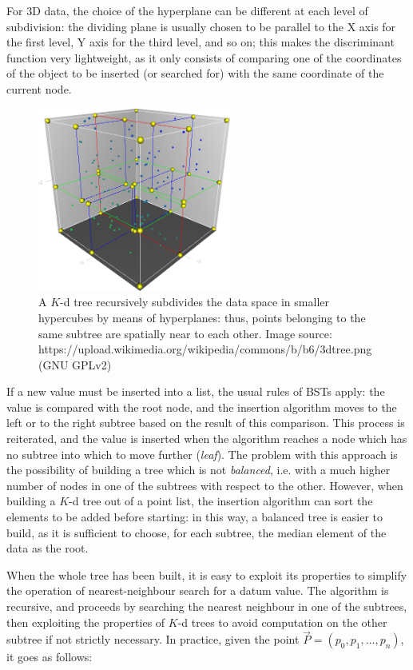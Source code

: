 For 3D data, the choice of the hyperplane can be different at each level of
subdivision: the dividing plane is usually chosen to be parallel to the X axis
for the first level, Y axis for the third level, and so on; this makes the
discriminant function very lightweight, as it only consists of comparing one of
the coordinates of the object to be inserted (or searched for) with the same
coordinate of the current node.

\begin{figure}[htbp]
\centering
  \includegraphics[width=2.5in]{./Graphics/kdtree} 
  \caption{A $K$-d tree recursively subdivides the data space in smaller
  hypercubes by means of hyperplanes: thus, points belonging to the same subtree
  are spatially near to each
  other. Image source:
https://upload.wikimedia.org/wikipedia/commons/b/b6/3dtree.png (GNU GPLv2)  \label{fig:kd-tree-subdiv}}
\end{figure}

If a new value must be inserted into a list, the usual rules of BSTs apply:
the value is compared with the root node, and the insertion algorithm moves to
the left or to the right subtree based on the result of this comparison. This
process is reiterated, and the
value is inserted when the algorithm reaches a node which has no subtree into
which to move further (\emph{leaf}). The problem with this approach is the
possibility of building a tree which is not \emph{balanced}, i.e. with a much
higher number of nodes in one of the subtrees with respect to the other. However,
when building a $K$-d tree out of a point list, the insertion algorithm can sort
the elements to be added before starting: in this way, a balanced tree is easier
to build, as it is sufficient to choose, for each subtree, the median element of
the data as the root.

When the whole tree has been built, it is easy to exploit its properties to
simplify the operation of nearest-neighbour search for a datum value. The
algorithm is recursive, and proceeds by searching the nearest neighbour in one
of the subtrees, then exploiting the properties of $K$-d trees to avoid
computation on the other subtree if not strictly necessary. In practice, given
the point $\vec{P}=\left(p_0,p_1,\dots,p_n\right)$, it goes
as follows:

